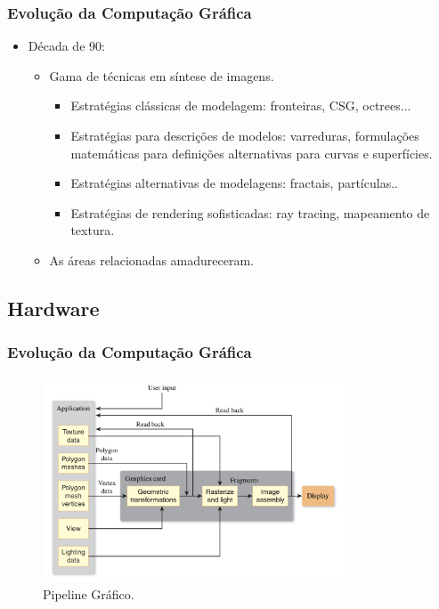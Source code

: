 \documentclass{beamer}
\begin{document}
\begin{frame}
\frametitle{Evolução da Computação Gráfica}

\begin{block}

	\begin{itemize}
		\item<1-> Década de 90:
		\begin{itemize}
			\item Gama de técnicas em síntese de imagens.
				\begin{itemize}
					\item Estratégias clássicas de modelagem: fronteiras, CSG, octrees...
					\item Estratégias para descrições de modelos: varreduras, formulações matemáticas para definições alternativas para curvas e superfícies.
					\item Estratégias alternativas de modelagens: fractais, partículas..
					\item Estratégias de rendering sofisticadas: ray tracing, mapeamento de textura. 
				\end{itemize}
			\item As áreas relacionadas amadureceram.
			
		\end{itemize}
	\end{itemize}
\end{block}

\end{frame}



\subsection{Hardware}
\begin{frame}
\frametitle{Evolução da Computação Gráfica}

	\begin{figure}[!h]
		\begin{center}
			\includegraphics[width=0.8\textwidth]{Figures/graphicPipeline}
			\caption{Pipeline Gráfico.}
		\end{center}
		
	\end{figure}

\end{frame}
\end{document}
